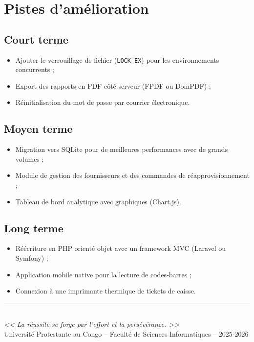 \documentclass[12pt,a4paper]{report}
\begin{document}
\section{Pistes d'amélioration}

\subsection{Court terme}
\begin{itemize}
  \item Ajouter le verrouillage de fichier (\texttt{LOCK\_EX}) pour les environnements concurrents ;
  \item Export des rapports en PDF côté serveur (FPDF ou DomPDF) ;
  \item Réinitialisation du mot de passe par courrier électronique.
\end{itemize}

\subsection{Moyen terme}
\begin{itemize}
  \item Migration vers SQLite pour de meilleures performances avec de grands volumes ;
  \item Module de gestion des fournisseurs et des commandes de réapprovisionnement ;
  \item Tableau de bord analytique avec graphiques (Chart.js).
\end{itemize}

\subsection{Long terme}
\begin{itemize}
  \item Réécriture en PHP orienté objet avec un framework MVC (Laravel ou Symfony) ;
  \item Application mobile native pour la lecture de codes-barres ;
  \item Connexion à une imprimante thermique de tickets de caisse.
\end{itemize}

\vspace{2cm}
\begin{center}
  \rule{0.5\linewidth}{0.5pt}\\[0.5cm]
  {\itshape << La réussite se forge par l'effort et la persévérance. >>}\\[0.3cm]
  {\small Université Protestante au Congo -- Faculté de Sciences Informatiques -- 2025-2026}
\end{center}
\end{document}
